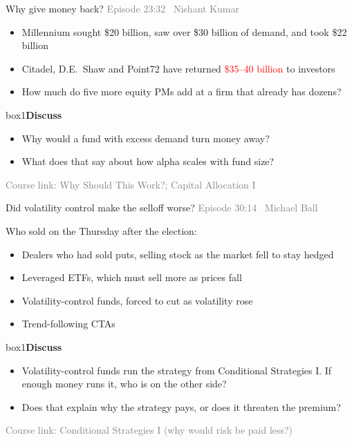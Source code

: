 \documentclass[aspectratio=169,10pt]{beamer}
\newcommand{\src}[1]{{\footnotesize\textcolor{gray}{Episode #1}}\par\vskip 6pt}
\newcommand{\course}[1]{{\footnotesize\textcolor{gray}{Course link: #1}}}
\newenvironment{discuss}{\begin{beamercolorbox}[rounded=true,sep=8pt]{box1}\textbf{Discuss}\par\vskip 3pt}{\end{beamercolorbox}}
\begin{document}
\begin{frame}[label=q8]{Why give money back?}
\src{23:32 \textbullet\ Nishant Kumar}
\begin{itemize}
\item Millennium sought \$20 billion, saw over \$30 billion of demand, and took \$22 billion
\vskip 6pt
\item Citadel, D.E.\ Shaw and Point72 have returned \textcolor{red}{\$35--40 billion} to investors
\vskip 6pt
\item How much do five more equity PMs add at a firm that already has dozens?
\end{itemize}
\vskip 10pt
\begin{discuss}
\begin{itemize}
\item Why would a fund with excess demand turn money away?
\item What does that say about how alpha scales with fund size?
\end{itemize}
\end{discuss}
\vfill
\course{Why Should This Work?; Capital Allocation I} \hfill \hyperlink{appendix_div}{}
\end{frame}

\begin{frame}[label=q9]{Did volatility control make the selloff worse?}
\src{30:14 \textbullet\ Michael Ball}
Who sold on the Thursday after the election:
\begin{itemize}
\item Dealers who had sold puts, selling stock as the market fell to stay hedged
\item Leveraged ETFs, which must sell more as prices fall
\item Volatility-control funds, forced to cut as volatility rose
\item Trend-following CTAs
\end{itemize}
\vskip 8pt
\begin{discuss}
\begin{itemize}
\item Volatility-control funds run the strategy from Conditional Strategies I. If enough money runs it, who is on the other side?
\item Does that explain why the strategy pays, or does it threaten the premium?
\end{itemize}
\end{discuss}
\vfill
\course{Conditional Strategies I (why would risk be paid less?)}
\end{frame}
\end{document}

